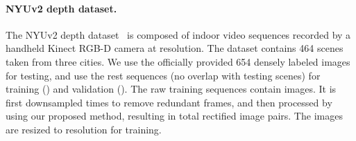 \documentclass{article}
\begin{document}
\paragraph{NYUv2 depth dataset.}
The NYUv2 depth dataset~\cite{silberman2012indoor} is composed of indoor video sequences recorded by a handheld Kinect RGB-D camera at  resolution.
The dataset contains 464 scenes taken from three cities.
We use the officially provided 654 densely labeled images for testing,
and use the rest  sequences (no overlap with testing scenes) for training () and validation ().
The raw training sequences contain  images.
It is first downsampled  times to remove redundant frames,
and then processed by using our proposed method, resulting in total  rectified image pairs.
The images are resized to  resolution for training.
\end{document}
